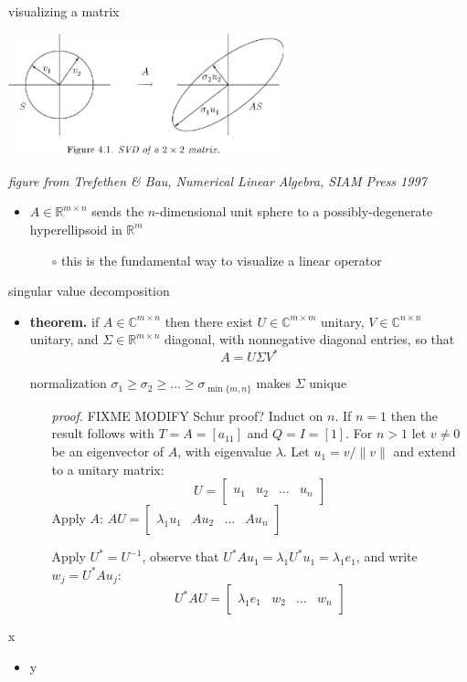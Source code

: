 \documentclass[10pt,hyperref]{beamer}
\newcommand{\CC}{\mathbb{C}}
\newcommand{\RR}{\mathbb{R}}
\newcommand{\ds}{\displaystyle}
\newcommand{\trefmatrixthree}[3]{\left[\begin{array}{c|c|c|c} & & & \\ #1 & #2 & \dots & #3 \\ & & & \end{array}\right]}
\begin{document}
\begin{frame}{visualizing a matrix}

\begin{center}
\includegraphics[width=0.6\textwidth]{figs/svd2d}
\end{center}

\vspace{-5mm}
\hfill \tiny \emph{figure from Trefethen \& Bau, \emph{Numerical Linear Algebra}, SIAM Press 1997} \normalsize

\bigskip
\begin{itemize}
\item $A \in \RR^{m\times n}$ sends the $n$-dimensional unit sphere to a possibly-degenerate hyperellipsoid in $\RR^m$
    \begin{itemize}
    \item[$\circ$] this is the fundamental way to visualize a linear operator
    \end{itemize}

\end{itemize}
\end{frame}


\begin{frame}{singular value decomposition}

\begin{itemize}
\item \textbf{theorem.} if $A\in \CC^{m\times n}$ then there exist $U\in \CC^{m\times m}$ unitary, $V \in \CC^{n\times n}$ unitary, and $\Sigma \in \RR^{m\times n}$ diagonal, with nonnegative diagonal entries, so that
    $$A = U \Sigma V^*$$

normalization $\sigma_1\ge \sigma_2 \ge \dots \ge \sigma_{\min\{m,n\}}$ makes $\Sigma$ unique

    \begin{itemize}
    \footnotesize
    \item[\emph{proof.}] FIXME MODIFY Schur proof?  Induct on $n$.  If $n=1$ then the result follows with $T=A=[a_{11}]$ and $Q=I=[1]$. For $n>1$ let $v\ne 0$ be an eigenvector of $A$, with eigenvalue $\lambda$. Let $u_1=v/\|v\|$ and extend to a unitary matrix:
    $$U = \trefmatrixthree{u_1}{u_2}{u_n}$$
Apply $A$: $\ds AU = \trefmatrixthree{\lambda_1 u_1}{A u_2}{A u_n}$

Apply $U^*=U^{-1}$, observe that $U^*Au_1 = \lambda_1 U^* u_1 = \lambda_1 e_1$, and write $w_j=U^*Au_j$:
    $$U^*AU = \trefmatrixthree{\lambda_1 e_1}{w_2}{w_n}$$
    \end{itemize}
\normalsize
\end{itemize}
\end{frame}


\begin{frame}{x}

\begin{itemize}
\item y
\end{itemize}
\end{frame}
\end{document}
